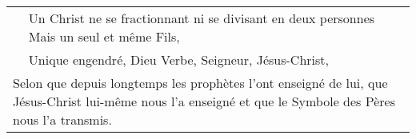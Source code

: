 \begin{table}[h!]
\begin{tabular}{p{}p{}p{}}
                                                                       & Un Christ ne se fractionnant ni se divisant en deux personnes Mais un seul et même Fils, &                                                                      \\
                                                                       & Unique engendré, Dieu Verbe, Seigneur, Jésus-Christ,                                     &                                                                      \\
\multicolumn{3}{p{\textwidth}}{Selon que depuis longtemps les prophètes l’ont enseigné de lui, que Jésus-Christ lui-même nous l’a enseigné et que le Symbole des Pères nous l’a transmis.}                                                          
\end{tabular}
\end{table}



